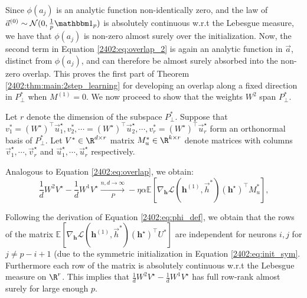 

 Since $\phi(a_j)$ is an analytic function non-identically zero, and the law of $\vec a^{(0)} \sim \mathcal{N}(0,\frac{1}{p}{\mathbbm 1}_p)$ is absolutely continuous w.r.t the Lebesgue measure, we have that $\phi(a_j)$ is non-zero almost surely over the initialization. Now, the second term in Equation \ref{2402:eq:overlap_2} is again an analytic function in $\vec{a}$, distinct from $\phi(a_j)$, and can therefore be almost surely absorbed into the non-zero overlap. This proves the first part of Theorem \ref{2402:thm:main:2step_learning} for developing an overlap along a fixed direction in $P^*_\perp$ when $M^{(1)}=0$. We now proceed to show that the weights $W^{2}$ span $P^*_\perp$.

Let $r$ denote the dimension of the subspace $P^*_\perp$. Suppose that $v^*_1 = (W^\star)^\top \vec{u}_1^\star, v^*_2,\cdots = (W^\star)^\top \vec{u}_2^\star, \cdots, v^*_r = (W^\star)^\top \vec{u}_r^\star$ form an orthonormal basis of $P^*_\perp$. Let $V^* \in \R^{d \times r}$ matrix $M_u^* \in \R^{k \times r}$  denote matrices with columns$ \vec{v}_1^\star,\cdots,  \vec{v}_r^\star$ and $\vec{u}_1^\star,\cdots,  \vec{u}_r^\star$ respectively.

Analogous to Equation \eqref{2402:eq:overlap}, we obtain:
\begin{equation}
     \frac{1}{d} W^{2}V^\star  -  \frac{1}{d} W^{1}V^\star \xrightarrow[P]{n,d \rightarrow \infty}- \eta \alpha \mathbb{E}\left[ \nabla_{\boldsymbol{h}} \mathcal{L}(\boldsymbol{h}^{(1)},\vec{h}^*) \left( \boldsymbol{h}^\star \right)^\top M_u^*\right],
\end{equation}

Following the derivation of Equation \eqref{2402:eq:phi_def}, we obtain that the rows of the matrix $\mathbb{E}\left[\nabla_{\boldsymbol{h}} \mathcal{L}(\boldsymbol{h}^{(1)},\vec{h}^*) \left( \boldsymbol{h}^\star \right)^\top U^*\right]$ are independent for neurons $i,j$ for $j \neq p-i+1$ (due to the symmetric initialization in Equation \eqref{2402:eq:init_sym}.
Furthermore each row of the matrix is absolutely continuous w.r.t the Lebesgue measure on $\R^r$. This implies that $\frac{1}{d} W^{2}V^\star  -  \frac{1}{d} W^{1}V^\star$ has full row-rank almost surely for large enough $p$.
 
